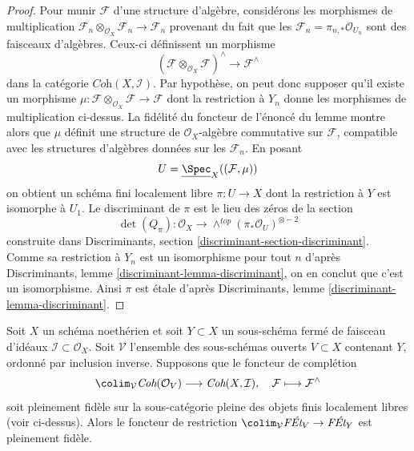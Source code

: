 \begin{proof}
\medskip\noindent
Pour munir $\mathcal{F}$ d'une structure d'algèbre, considérons les
morphismes de multiplication
$\mathcal{F}_n \otimes_{\mathcal{O}_X} \mathcal{F}_n \to \mathcal{F}_n$
provenant du fait que les $\mathcal{F}_n = \pi_{n, *}\mathcal{O}_{U_n}$
sont des faisceaux d'algèbres. Ceux-ci définissent un morphisme
$$
(\mathcal{F}\otimes_{\mathcal{O}_X} \mathcal{F})^\wedge
\longrightarrow
\mathcal{F}^\wedge
$$
dans la catégorie $\textit{Coh}(X, \mathcal{I})$. Par hypothèse,
on peut donc supposer qu'il existe un morphisme
$\mu : \mathcal{F}\otimes_{\mathcal{O}_X} \mathcal{F} \to \mathcal{F}$
dont la restriction à $Y_n$ donne les morphismes de multiplication ci-dessus.
La fidélité du foncteur de l'énoncé du lemme montre alors
que $\mu$ définit une structure de $\mathcal{O}_X$-algèbre commutative
sur $\mathcal{F}$, compatible avec les structures d'algèbres données
sur les $\mathcal{F}_n$.
En posant
$$
U = \underline{\Spec}_X((\mathcal{F}, \mu))
$$
on obtient un schéma fini localement libre $\pi : U \to X$ dont la restriction
à $Y$ est isomorphe à $U_1$. Le discriminant de $\pi$ est le lieu des zéros
de la section
$$
\det(Q_\pi) :
\mathcal{O}_X
\longrightarrow
\wedge^{top}(\pi_*\mathcal{O}_U)^{\otimes -2}
$$
construite dans
Discriminants, section \ref{discriminant-section-discriminant}.
Comme sa restriction à $Y_n$ est un isomorphisme pour tout $n$
d'après Discriminants, lemme \ref{discriminant-lemma-discriminant},
on en conclut que c'est un isomorphisme. Ainsi $\pi$ est étale d'après
Discriminants, lemme \ref{discriminant-lemma-discriminant}.
\end{proof}

\begin{lemma}
\label{lemma-restriction-fully-faithful-general}
Soit $X$ un schéma noethérien et soit $Y \subset X$ un sous-schéma fermé
de faisceau d'idéaux $\mathcal{I} \subset \mathcal{O}_X$.
Soit $\mathcal{V}$ l'ensemble des sous-schémas ouverts $V \subset X$ contenant $Y$,
ordonné par inclusion inverse. Supposons que le foncteur de complétion
$$
\colim_\mathcal{V} \textit{Coh}(\mathcal{O}_V)
\longrightarrow
\textit{Coh}(X, \mathcal{I}),
\quad
\mathcal{F} \longmapsto \mathcal{F}^\wedge
$$
soit pleinement fidèle sur la sous-catégorie pleine des
objets finis localement libres (voir ci-dessus).
Alors le foncteur de restriction
$\colim_\mathcal{V} \textit{F\'Et}_V \to \textit{F\'Et}_Y$
est pleinement fidèle.
\end{lemma}

